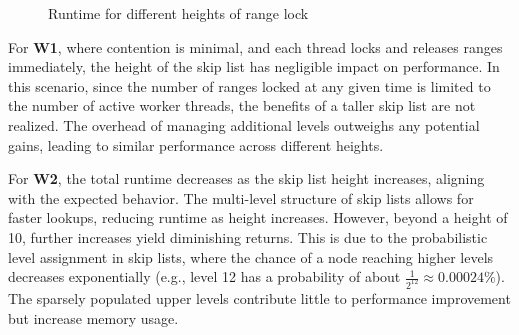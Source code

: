 \begin{figure}[h]
    \centering
    \caption{Runtime for different heights of range lock}
\end{figure}


For \textbf{W1}, where contention is minimal, and each thread locks and releases ranges immediately, the height of the skip list has negligible impact on performance. 
In this scenario, since the number of ranges locked at any given time is limited to the number of active worker threads, the benefits of a taller skip list are not realized. 
The overhead of managing additional levels outweighs any potential gains, leading to similar performance across different heights.

For \textbf{W2}, the total runtime decreases as the skip list height increases, aligning with the expected behavior. 
The multi-level structure of skip lists allows for faster lookups, reducing runtime as height increases. 
However, beyond a height of 10, further increases yield diminishing returns. 
This is due to the probabilistic level assignment in skip lists, where the chance of a node reaching higher levels decreases exponentially (e.g., level 12 has a probability of about \(\frac{1}{2^{12}} \approx 0.00024\%\)). 
The sparsely populated upper levels contribute little to performance improvement but increase memory usage.

